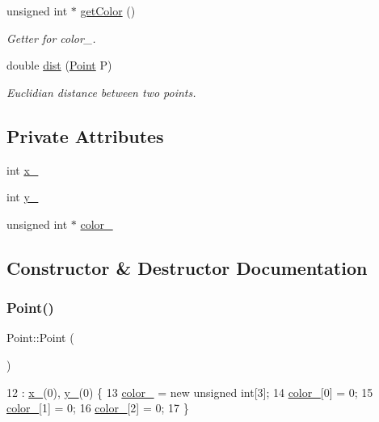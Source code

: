 \begin{DoxyCompactItemize}
unsigned int $\ast$ \mbox{\hyperlink{class_point_a1aa902dd929328baec8c8f6970284ac2}{get\+Color}} ()
\begin{DoxyCompactList}\small\item\em Getter for color\+\_\+. \end{DoxyCompactList}\item 
double \mbox{\hyperlink{class_point_a31c7abcc57e3a3aefd0724d3c55c52a8}{dist}} (\mbox{\hyperlink{class_point}{Point}} P)
\begin{DoxyCompactList}\small\item\em Euclidian distance between two points. \end{DoxyCompactList}\end{DoxyCompactItemize}
\subsection*{Private Attributes}
\begin{DoxyCompactItemize}
\item 
int \mbox{\hyperlink{class_point_acfe156c55546f7e551fb54c7ea08a6cb}{x\+\_\+}}
\item 
int \mbox{\hyperlink{class_point_ae45effa2adb0036e4a770abb9b1160e6}{y\+\_\+}}
\item 
unsigned int $\ast$ \mbox{\hyperlink{class_point_af3333647d73989850d2fbf64d14eb9cb}{color\+\_\+}}
\end{DoxyCompactItemize}


\subsection{Constructor \& Destructor Documentation}
\mbox{\label{class_point_ad92f2337b839a94ce97dcdb439b4325a}} 
\subsubsection{\texorpdfstring{Point()}{Point()}\hspace{0.1cm}{\footnotesize\ttfamily [1/3]}}
{\footnotesize\ttfamily Point\+::\+Point (\begin{DoxyParamCaption}{ }\end{DoxyParamCaption})}


\begin{DoxyCode}
12              : \mbox{\hyperlink{class_point_acfe156c55546f7e551fb54c7ea08a6cb}{x\_}}(0), \mbox{\hyperlink{class_point_ae45effa2adb0036e4a770abb9b1160e6}{y\_}}(0) \{
13     \mbox{\hyperlink{class_point_af3333647d73989850d2fbf64d14eb9cb}{color\_}} = \textcolor{keyword}{new} \textcolor{keywordtype}{unsigned} \textcolor{keywordtype}{int}[3];
14     \mbox{\hyperlink{class_point_af3333647d73989850d2fbf64d14eb9cb}{color\_}}[0] = 0;
15     \mbox{\hyperlink{class_point_af3333647d73989850d2fbf64d14eb9cb}{color\_}}[1] = 0;
16     \mbox{\hyperlink{class_point_af3333647d73989850d2fbf64d14eb9cb}{color\_}}[2] = 0;
17 \}
\end{DoxyCode}
\mbox{\label{class_point_af6c52ba545e9d933632b6d4edbf86622}} 
